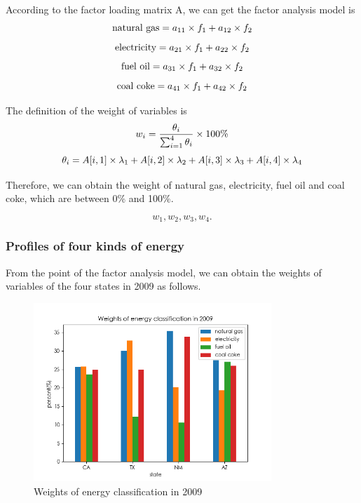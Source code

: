\documentclass[a4paper,11pt]{article}
\begin{document}
\par According to the factor loading matrix A, we can get the factor analysis model is
\begin{equation}
    \centering
    \text{natural gas}=a_{11} \times f_1+a_{12} \times f_2
\end{equation}
\begin{equation}
    \centering
    \text{electricity}=a_{21} \times f_1+a_{22} \times f_2
\end{equation}
\begin{equation}
    \centering
    \text{fuel oil}=a_{31} \times f_1+a_{32} \times f_2
\end{equation}
\begin{equation}
    \centering
    \text{coal coke}=a_{41} \times f_1+a_{42} \times f_2
\end{equation}
\par The definition of the weight of variables is\cite{5}
\begin{equation}
    \centering
w_i=\frac{ \theta_i }{ \sum_{i=1}^{4}\theta_i } \times 100\%
\end{equation}
\begin{equation}
    \centering
\theta_i=A[i,1] \times \lambda_1+A[i,2] \times \lambda_2+A[i,3] \times \lambda_3+A[i,4] \times \lambda_4
\end{equation}

\par Therefore, we can obtain the weight of natural gas, electricity, fuel oil and coal coke, which are between 0\% and 100\%.

\[
w_1, w_2, w_3, w_4.
\]

\subsubsection{Profiles of four kinds of energy}

\par From the point of the factor analysis model, we can obtain the weights of variables of the four states in 2009 as follows.

\begin{figure}[H] 
    \centering 
    \includegraphics[width=0.8\textwidth]{./Pic/1-1.png}
    \caption{Weights of energy classification in 2009}
    \label{fig:1-1}
\end{figure}
\end{document}
